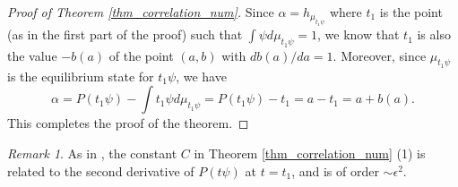 \documentclass[11pt]{amsart}
\theoremstyle{plain}
\theoremstyle{definition}
\theoremstyle{remark}
\newtheorem{rmk}[thm]{Remark}
\begin{document}
\begin{proof}[Proof of Theorem \ref{thm_correlation_num}]
Since $\alpha = h_{\mu_{t_1\psi}}$ where $t_1$
is the point (as in the first part of the proof)
such that $\int \psi d\mu_{t_1\psi} = 1$, we know that $t_1$ is also
the value $-b(a)$ of the point $(a,b)$ with $db(a)/da=1$.
Moreover, since $\mu_{t_1\psi}$
is the
equilibrium state for $t_1\psi$, 
we have
\begin{equation*}
\alpha 
= P(t_1\psi) 
-
\int t_1\psi d\mu_{{t_1\psi}}
= P(t_1\psi) -
t_1
 = a -t_1
 =
 a+b(a).
\end{equation*}
This completes the proof of the theorem.
\end{proof}

\begin{rmk}
As in \cite{SchwartzSharp93}, the constant 
$C$ in Theorem \ref{thm_correlation_num} (1) is related to the second derivative of $P(t\psi)$ at $t=t_1$, and is of order $\sim \epsilon^2$.
\end{rmk}






\printbibliography

%
%
\end{document}
